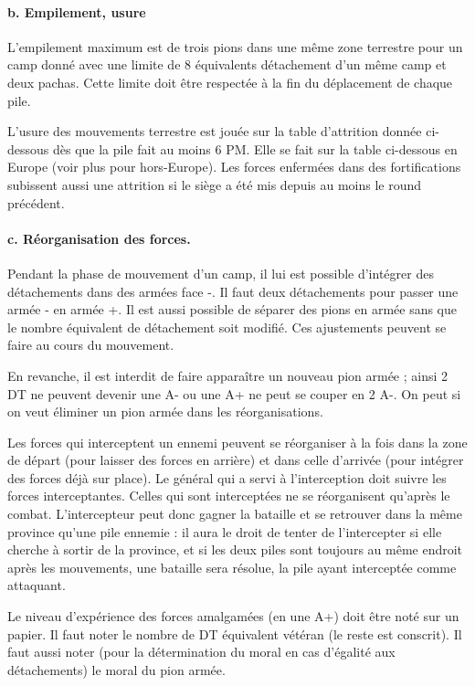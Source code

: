 \paragraph{b. Empilement, usure}
L'empilement maximum est de trois pions dans une même zone terrestre pour
un camp donné avec une limite de 8 équivalents détachement d'un
même camp et deux pachas. Cette limite doit
être respectée à la fin du déplacement de chaque pile.

L'usure des mouvements terrestre  est jouée
sur la table d'attrition donnée ci-dessous dès que la pile
fait au moins 6 PM. Elle se fait sur la table ci-dessous en Europe
(voir plus pour hors-Europe). Les forces enfermées dans des
fortifications subissent aussi une attrition si le siège a été
mis depuis au moins le round précédent.


\paragraph{c. Réorganisation des forces.}
Pendant la phase de mouvement d'un camp, il lui est possible d'intégrer des détachements
dans des armées face -. Il faut deux détachements pour passer une armée - en armée +. 
Il est aussi possible de séparer des pions en armée sans que le nombre équivalent de
détachement soit modifié. Ces ajustements peuvent se faire au cours du mouvement.

En revanche, il est interdit de faire apparaître un nouveau pion armée ; ainsi 2 DT
ne peuvent devenir une A- ou une A+ ne peut se couper en 2 A-. On peut si on veut
éliminer un pion armée dans les réorganisations.

Les forces qui interceptent un ennemi peuvent se réorganiser à la fois dans
la zone de départ (pour laisser des forces en arrière) et dans celle d'arrivée
(pour intégrer des forces déjà sur place). Le général qui a servi à l'interception
doit suivre les forces interceptantes. Celles qui sont interceptées ne
se réorganisent qu'après le combat. L'intercepteur peut donc gagner la
bataille et se retrouver dans la même province qu'une pile ennemie : il
aura le droit de tenter de l'intercepter si elle cherche à sortir de la province,
et si les deux piles sont toujours au même endroit après les mouvements,
une bataille sera résolue, la pile ayant interceptée comme attaquant.

Le niveau d'expérience des forces amalgamées (en une A+) doit être noté sur un papier.
Il faut noter le nombre de DT équivalent vétéran (le reste est conscrit).
Il faut aussi noter (pour la détermination du moral en cas d'égalité aux détachements)
le moral du pion armée.

